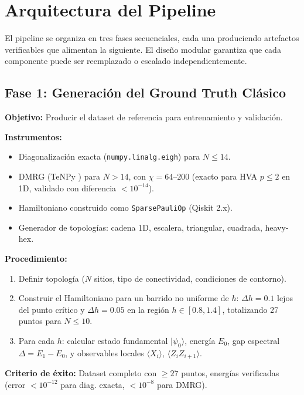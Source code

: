 \documentclass[11pt,a4paper,spanish]{book}
\begin{document}
\section{Arquitectura del Pipeline}

El pipeline se organiza en tres fases secuenciales, cada una produciendo artefactos verificables que alimentan la siguiente. El diseño modular garantiza que cada componente puede ser reemplazado o escalado independientemente.

\subsection{Fase 1: Generación del Ground Truth Clásico}

\textbf{Objetivo:} Producir el dataset de referencia para entrenamiento y validación.

\textbf{Instrumentos:}
\begin{itemize}
    \item Diagonalización exacta (\texttt{numpy.linalg.eigh}) para $N \leq 14$.
    \item DMRG (TeNPy \citep{hauschild2018}) para $N > 14$, con $\chi = 64$--$200$ (exacto para HVA $p \leq 2$ en 1D, validado con diferencia $< 10^{-14}$).
    \item Hamiltoniano construido como \texttt{SparsePauliOp} (Qiskit 2.x).
    \item Generador de topologías: cadena 1D, escalera, triangular, cuadrada, heavy-hex.
\end{itemize}

\textbf{Procedimiento:}
\begin{enumerate}
    \item Definir topología ($N$ sitios, tipo de conectividad, condiciones de contorno).
    \item Construir el Hamiltoniano para un barrido no uniforme de $h$: $\Delta h = 0.1$ lejos del punto crítico y $\Delta h = 0.05$ en la región $h \in [0.8, 1.4]$, totalizando 27 puntos para $N \leq 10$.
    \item Para cada $h$: calcular estado fundamental $|\psi_0\rangle$, energía $E_0$, gap espectral $\Delta = E_1 - E_0$, y observables locales $\langle X_i \rangle$, $\langle Z_i Z_{i+1} \rangle$.
\end{enumerate}

\textbf{Criterio de éxito:} Dataset completo con $\geq 27$ puntos, energías verificadas (error $< 10^{-12}$ para diag. exacta, $< 10^{-8}$ para DMRG).
\end{document}
